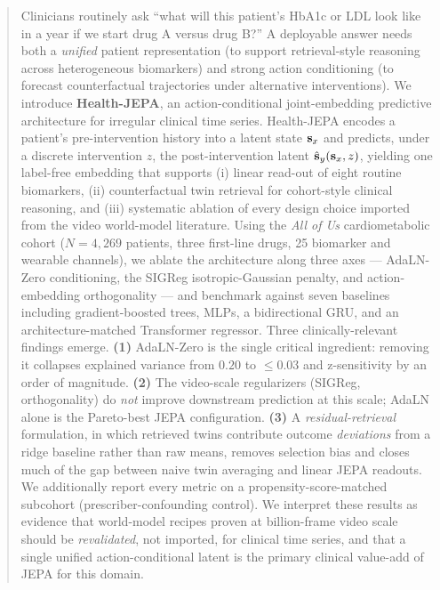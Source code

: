 \date{April 2026}


\maketitle

\begin{abstract}
Clinicians routinely ask ``what will this patient's HbA1c or LDL look like in
a year if we start drug A versus drug B?'' A deployable answer needs both a
\emph{unified} patient representation (to support retrieval-style reasoning
across heterogeneous biomarkers) and strong action conditioning (to forecast
counterfactual trajectories under alternative interventions). We introduce
\textbf{Health-JEPA}, an action-conditional joint-embedding predictive
architecture for irregular clinical time series. Health-JEPA encodes a
patient's pre-intervention history into a latent state $\sx$ and predicts,
under a discrete intervention $z$, the post-intervention latent
$\syhat(\sx, z)$, yielding one label-free embedding that supports (i)
linear read-out of eight routine biomarkers, (ii) counterfactual twin
retrieval for cohort-style clinical reasoning, and (iii) systematic
ablation of every design choice imported from the video world-model
literature. Using the \emph{All of Us} cardiometabolic cohort
($N{=}4{,}269$ patients, three first-line drugs, 25 biomarker and wearable
channels), we ablate the architecture along three axes --- AdaLN-Zero
conditioning, the SIGReg isotropic-Gaussian penalty, and action-embedding
orthogonality --- and benchmark against seven baselines including
gradient-boosted trees, MLPs, a bidirectional GRU, and an
architecture-matched Transformer regressor. Three clinically-relevant
findings emerge. \textbf{(1)} AdaLN-Zero is the single critical ingredient:
removing it collapses explained variance from $0.20$ to $\leq 0.03$ and
z-sensitivity by an order of magnitude. \textbf{(2)} The video-scale
regularizers (SIGReg, orthogonality) do \emph{not} improve downstream
prediction at this scale; AdaLN alone is the Pareto-best JEPA configuration.
\textbf{(3)} A \emph{residual-retrieval} formulation, in which retrieved
twins contribute outcome \emph{deviations} from a ridge baseline rather
than raw means, removes selection bias and closes much of the gap between
naive twin averaging and linear JEPA readouts. We additionally report every
metric on a propensity-score-matched subcohort (prescriber-confounding
control). We interpret these results as evidence that world-model recipes
proven at billion-frame video scale should be \emph{revalidated}, not
imported, for clinical time series, and that a single unified
action-conditional latent is the primary clinical value-add of JEPA for
this domain.
\end{abstract}

